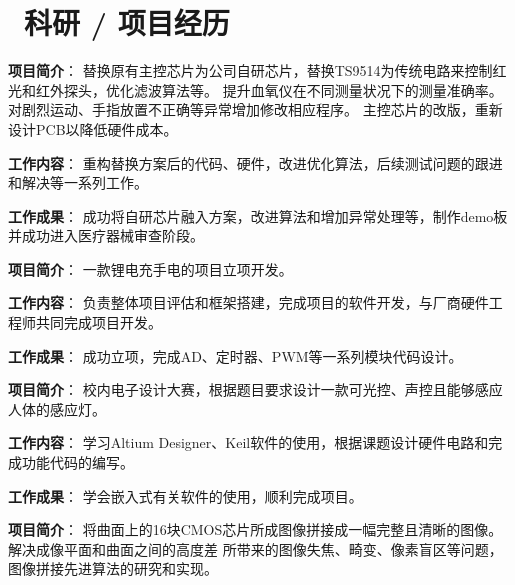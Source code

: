 \documentclass{resume}
\begin{document}
\section{\textcolor[RGB]{50,50,190}{\faUsers\ 科研 / 项目经历}}

\textcolor[RGB]{80,100,190}{\textbf{项目简介}}：
替换原有主控芯片为公司自研芯片，替换TS9514为传统电路来控制红光和红外探头，优化滤波算法等。
提升血氧仪在不同测量状况下的测量准确率。对剧烈运动、手指放置不正确等异常增加修改相应程序。
主控芯片的改版，重新设计PCB以降低硬件成本。

\textcolor[RGB]{80,100,190}{\textbf{工作内容}}：
重构替换方案后的代码、硬件，改进优化算法，后续测试问题的跟进和解决等一系列工作。

\textcolor[RGB]{80,100,190}{\textbf{工作成果}}：
成功将自研芯片融入方案，改进算法和增加异常处理等，制作demo板并成功进入医疗器械审查阶段。

\textcolor[RGB]{80,100,190}{\textbf{项目简介}}：
一款锂电充手电的项目立项开发。

\textcolor[RGB]{80,100,190}{\textbf{工作内容}}：
负责整体项目评估和框架搭建，完成项目的软件开发，与厂商硬件工程师共同完成项目开发。

\textcolor[RGB]{80,100,190}{\textbf{工作成果}}：
成功立项，完成AD、定时器、PWM等一系列模块代码设计。


\textcolor[RGB]{80,100,190}{\textbf{项目简介}}：
校内电子设计大赛，根据题目要求设计一款可光控、声控且能够感应人体的感应灯。

\textcolor[RGB]{80,100,190}{\textbf{工作内容}}：
学习Altium Designer、Keil软件的使用，根据课题设计硬件电路和完成功能代码的编写。

\textcolor[RGB]{80,100,190}{\textbf{工作成果}}：
学会嵌入式有关软件的使用，顺利完成项目。

\textcolor[RGB]{80,100,190}{\textbf{项目简介}}：
将曲面上的16块CMOS芯片所成图像拼接成一幅完整且清晰的图像。解决成像平面和曲面之间的高度差
所带来的图像失焦、畸变、像素盲区等问题，图像拼接先进算法的研究和实现。
\end{document}
